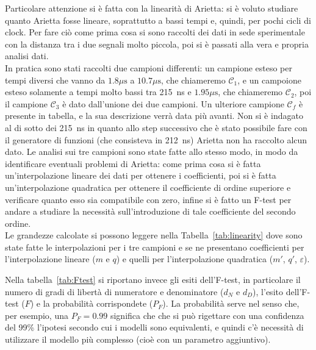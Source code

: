 Particolare attenzione si è fatta con la linearità di Arietta: si è voluto studiare quanto Arietta fosse lineare, soprattutto a bassi tempi e, quindi, per pochi cicli di clock. Per fare ciò come prima cosa si sono raccolti dei dati in sede sperimentale con la distanza tra i due segnali molto piccola, poi si è passati alla vera e propria analisi dati.\\

In pratica sono stati raccolti due campioni differenti: un campione esteso per tempi diversi che vanno da $1.8 \mu\text{s}$ a $10.7 \mu\text{s}$, che chiameremo $\mathcal{C}_1$, e un campoione esteso solamente a tempi molto bassi tra 215~ns e $1.95\mu\text{s}$, che chiameremo $\mathcal{C}_2$, poi il campione $\mathcal{C}_3$ è dato dall'unione dei due campioni. Un ulteriore campione $\mathcal{C}_f$ è presente in tabella, e la sua descrizione verrà data più avanti. Non si è indagato al di sotto dei 215~ns in quanto allo step successivo che è stato possibile fare con il generatore di funzioni (che consisteva in 212~ns) Arietta non ha raccolto alcun dato. Le analisi sui tre campioni sono state fatte allo stesso modo, in modo da identificare eventuali problemi di Arietta: come prima cosa si è fatta un'interpolazione lineare dei dati per ottenere i coefficienti, poi si è fatta un'interpolazione quadratica per ottenere il coefficiente di ordine superiore e verificare quanto esso sia compatibile con zero, infine si è fatto un F-test per andare a studiare la necessità sull'introduzione di tale coefficiente del secondo ordine.\\

Le grandezze calcolate si possono leggere nella Tabella~\ref{tab:linearity} dove sono state fatte le interpolazioni per i tre campioni e se ne presentano coefficienti per l'interpolazione lineare ($m$ e $q$) e quelli per l'interpolazione quadratica ($m'$, $q'$, $\varepsilon$).\\

Nella tabella~\ref{tab:Ftest} si riportano invece gli esiti dell'F-test, in particolare il numero di gradi di libertà di numeratore e denominatore ($d_N$ e $d_D$), l'esito dell'F-test ($F$) e la probabilità corrispondete ($P_F$). La probabilità serve nel senso che, per esempio, una $P_F = 0.99$ significa che che si può rigettare con una confidenza del 99\% l'ipotesi secondo cui i modelli sono equivalenti, e quindi c'è necessità di utilizzare il modello più complesso (cioè con un parametro aggiuntivo).\\

